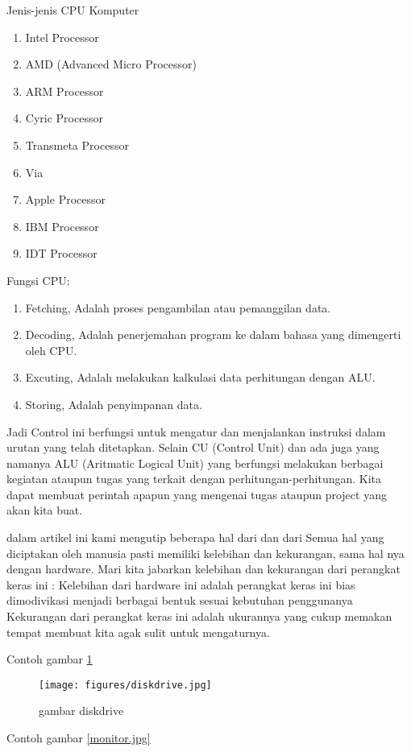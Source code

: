 Jenis-jenis CPU Komputer
\begin{enumerate}
\item Intel Processor
\item AMD (Advanced Micro Processor)
\item ARM Processor
\item Cyric Processor
\item Transmeta Processor
\item Via
\item Apple Processor
\item IBM Processor
\item IDT Processor
\end{enumerate}
Fungsi CPU:
\begin{enumerate}
\item Fetching, Adalah proses pengambilan atau pemanggilan data.
\item Decoding, Adalah penerjemahan program ke dalam bahasa yang dimengerti oleh CPU.
\item Excuting, Adalah melakukan kalkulasi data perhitungan dengan ALU.
\item Storing, Adalah penyimpanan data.
\end{enumerate}
Jadi Control ini berfungsi untuk mengatur dan menjalankan instruksi dalam urutan yang telah ditetapkan. Selain CU (Control Unit) dan ada juga yang namanya ALU (Aritmatic Logical Unit) yang berfungsi melakukan berbagai kegiatan ataupun tugas yang terkait dengan perhitungan-perhitungan.  Kita dapat membuat perintah apapun yang mengenai tugas ataupun project yang akan kita buat.

dalam artikel ini kami mengutip beberapa hal dari \cite{komputer2006sgs} dan dari \cite{tanenbaum2009modern}
Semua hal yang diciptakan oleh  manusia pasti memiliki kelebihan dan kekurangan, sama hal nya dengan hardware. Mari kita jabarkan kelebihan dan kekurangan dari perangkat keras ini :
Kelebihan dari hardware ini adalah perangkat keras ini bias dimodivikasi menjadi berbagai bentuk sesuai kebutuhan penggunanya
Kekurangan dari perangkat keras ini adalah ukurannya yang cukup memakan tempat membuat kita agak sulit untuk mengaturnya.

Contoh gambar 
\ref{diskdrive.jpg}
\begin{figure}[ht]
\centerline{\texttt{[image: figures/diskdrive.jpg]}}
\caption{gambar diskdrive}
\label{diskdrive.jpg}
\end{figure}

Contoh gambar \ref{monitor.jpg} 

